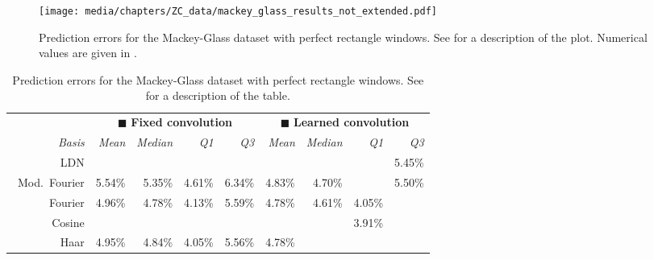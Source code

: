 \begin{figure}[p]
\centering
\texttt{[image: media/chapters/ZC\_data/mackey\_glass\_results\_not\_extended.pdf]}
\caption[Prediction errors for the Mackey-Glass dataset with perfect rectangle windows]{Prediction errors for the Mackey-Glass dataset with perfect rectangle windows. See  for a description of the plot.
Numerical values are given in .}
\label{fig:mackey_glass_ne}
\end{figure}

\begin{table}[p]
	\caption[Prediction errors for the Mackey-Glass dataset with perfect rectangle windows]{Prediction errors for the Mackey-Glass dataset with perfect rectangle windows. See  for a description of the table.}
	\label{tbl:mackey_glass_results_ne}
	\centering\small\sffamily
	\setlength{\tabcolsep}{8.75pt}
	\begin{tabular}{r  r r r r  r r r r}
	\toprule
	& \multicolumn{4}{c}{{\color{skyblue1}$\blacksquare$} \textbf{Fixed convolution}}
	& \multicolumn{4}{c}{{\color{aluminium2}$\blacksquare$} \textbf{Learned convolution}} \\
	\cmidrule(r){2-5}\cmidrule(l){6-9}
	\emph{Basis} &
	\emph{Mean} &
	\emph{Median} &
	\emph{Q1} &
	\emph{Q3} &
	\emph{Mean} &
	\emph{Median} &
	\emph{Q1} &
	\emph{Q3} \\
	\midrule
	\symLTI~LDN &
	 \cellcolor{CornflowerBlue!25}{4.80\%} &
	 \cellcolor{CornflowerBlue!25}{4.60\%} &
	 \cellcolor{CornflowerBlue!25}{4.03\%} &
	 \cellcolor{CornflowerBlue!50}{5.35\%} &
	 \cellcolor{CornflowerBlue!25}{4.69\%} &
	 \cellcolor{CornflowerBlue!75}{4.41\%} &
	 \cellcolor{CornflowerBlue!25}{3.84\%} &
	5.45\% \\
	\symLTI~Mod.~Fourier &
	5.54\% &
	5.35\% &
	4.61\% &
	6.34\% &
	4.83\% &
	4.70\% &
	 \cellcolor{CornflowerBlue!50}{3.82\%} &
	5.50\% \\
	\symSDT~Fourier &
	4.96\% &
	4.78\% &
	4.13\% &
	5.59\% &
	4.78\% &
	4.61\% &
	4.05\% &
	 \cellcolor{CornflowerBlue!25}{5.44\%} \\
	\symSDT~Cosine &
	 \cellcolor{CornflowerBlue!75}{4.68\%} &
	 \cellcolor{CornflowerBlue!50}{4.53\%} &
	 \cellcolor{CornflowerBlue!75}{3.84\%} &
	 \cellcolor{CornflowerBlue!75}{5.19\%} &
	 \cellcolor{CornflowerBlue!75}{4.68\%} &
	 \cellcolor{CornflowerBlue!25}{4.48\%} &
	3.91\% &
	 \cellcolor{CornflowerBlue!50}{5.28\%} \\
	\symSDT~Haar &
	4.95\% &
	4.84\% &
	4.05\% &
	5.56\% &
	4.78\% &

\end{tabular}
\end{table}
